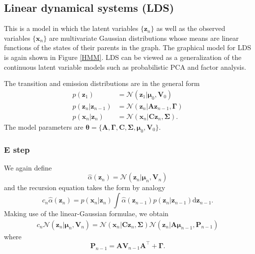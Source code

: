\documentclass[a4paper]{book}
\newcommand{\ud}{\mathrm{d}}
\renewcommand{\bf}{\mathbf}
\renewcommand{\cal}{\mathcal}
\newcommand{\bs}{\boldsymbol}
\begin{document}
\subsection{Linear dynamical systems (LDS)}
This is a model in which the latent variables $\{\bf{z}_n\}$ as well as the observed variables $\{\bf{x}_n\}$ are multivariate Gaussian distributions whose means are linear functions of the states of their parents in the graph. The graphical model for LDS is again shown in Figure \ref{HMM}. LDS can be viewed as a generalization of the continuous latent variable models such as probabilistic PCA and factor analysis. 

The transition and emission distributions are in the general form
\begin{align}
	p(\bf{z}_1) &= \cal{N}(\bf{z}_1|\bs{\mu}_0,\bf{V}_0)\\
	p(\bf{z}_n|\bf{z}_{n-1}) &= \cal{N}(\bf{z}_n|\bf{Az}_{n-1},\bs{\Gamma}) \\
	p(\bf{x}_n|\bf{z}_n) &= \cal{N}(\bf{x}_n|\bf{Cz}_{n},\bs{\Sigma}).
\end{align}
The model parameters are $\bs{\theta}=\{ \bf{A},\bs{\Gamma},\bf{C},\bs{\Sigma},\bs{\mu}_0,\bf{V}_0 \}$.
\subsubsection{E step}
We again define
\begin{equation}
	\hat{\alpha}(\bf{z}_n) = \cal{N}(\bf{z}_n|\bs{\mu}_n,\bf{V}_n)
\end{equation}
and the recursion equation takes the form by analogy
\begin{equation}
	c_n \hat{\alpha}(\bf{z}_n) = p(\bf{x}_n|\bf{z}_n)\int \hat{\alpha}(\bf{z}_{n-1})p(\bf{z}_n|\bf{z}_{n-1})\ud \bf{z}_{n-1}.
\end{equation}
Making use of the linear-Gaussian formulae, we obtain
\begin{align}
	c_n \cal{N}(\bf{z}_n|\bs{\mu}_n,\bf{V}_n) = \cal{N}(\bf{x}_n|\bf{Cz}_n,\bs{\Sigma})\cal{N}(\bf{z}_n|\bf{A}\bs{\mu}_{n-1},\bf{P}_{n-1})
\end{align}
where
\begin{equation}
	\bf{P}_{n-1} = \bf{AV}_{n-1}\bf{A}^{\intercal} + \bs{\Gamma}.
\end{equation}
\end{document}
